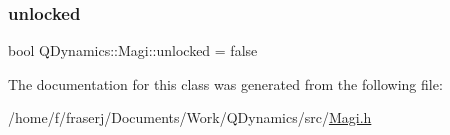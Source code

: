 \subsubsection{\texorpdfstring{unlocked}{unlocked}}
{\footnotesize\ttfamily bool Q\+Dynamics\+::\+Magi\+::unlocked = false}



The documentation for this class was generated from the following file\+:\begin{DoxyCompactItemize}
\item 
/home/f/fraserj/\+Documents/\+Work/\+Q\+Dynamics/src/\hyperlink{Magi_8h}{Magi.\+h}\end{DoxyCompactItemize}
